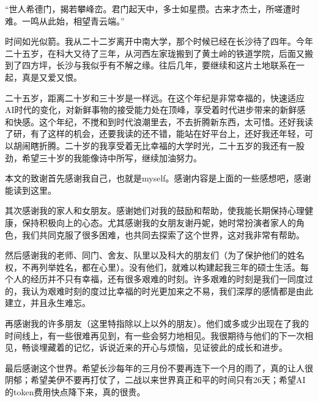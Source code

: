 

\begin{ack}
“世人希德门，揭若攀峰峦。君门起天中，多士如星攒。古来才杰士，所嗟遭时难。一鸣从此始，相望青云端。”

时间如光似箭。我从二十二岁离开中南大学，那个时候已经在长沙待了四年。今年二十五岁，在科大又待了三年，从河西左家珑搬到了黄土岭的铁道学院，后面又搬到了四方坪，长沙与我似乎有不解之缘。往后几年，要继续和这片土地联系在一起，真是又爱又恨。

二十五岁，距离二十岁和三十岁是一样远。在这个年纪是非常幸福的，快速适应AI时代的变化，对新鲜事物的接受能力处在顶峰，享受着时代进步带来的新鲜感和快感。这个年纪，不搅和到时代浪潮里去，不去折腾新东西，太可惜。还好我读了研，有了这样的机会，还要我读的还不错，能站在好平台上，还好我还年轻，可以胡闹瞎折腾。二十岁的我享受着无比幸福的大学时光，二十五岁的我还有一股劲，希望三十岁的我能像诗中所写，继续加油努力。

本文的致谢首先感谢我自己，也就是myself。感谢内容是上面的一些感想吧，感谢能读到这里。

其次感谢我的家人和女朋友。感谢她们对我的鼓励和帮助，使我能长期保持心理健康，保持积极向上的心态。尤其感谢我的女朋友谢丹妮，她时常扮演者家人的角色，我们共同克服了很多困难，也共同去探索了这个世界，这对我非常有帮助。

然后感谢我的老师、同门、舍友、队里以及科大的朋友们（为了保护他们的姓名权，不再列举姓名，都在心里）。没有他们，就难以构建起我三年的硕士生活。每个人的经历并不只有幸福，还有很多艰难的时刻。许多艰难的时刻是我们一同度过的，我认为艰难时刻的度过比幸福的时光更加来之不易，我们深厚的感情都是由此建立，并且永生难忘。

再感谢我的许多朋友（这里特指除以上以外的朋友）。他们或多或少出现在了我的时间线上，有一些很难再见到，有一些会努力地相见。我很期待与他们的下一次相见，畅谈埋藏着的记忆，诉说近来的开心与烦恼，见证彼此的成长和进步。

最后感谢这个世界。希望长沙每年的三月份不要再连下一个月的雨了，真的让人很阴郁；希望美伊不要再打仗了，二战以来世界真正和平的时间只有26天；希望AI的token费用快点降下来，真的很贵。

\end{ack}

